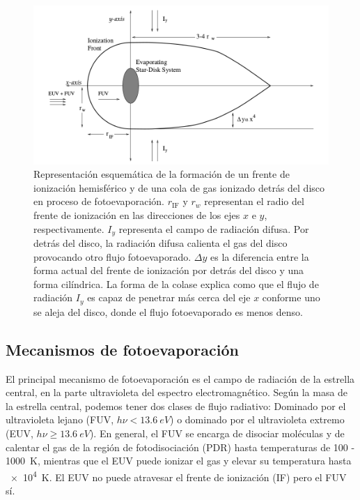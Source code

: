 \begin{figure}
  \centering
  \includegraphics[width=0.8\linewidth]{./Figures/Johnstone-shape}
  \caption{Representación esquemática de la formación de un frente de ionización hemisférico y de una cola de gas ionizado detrás del disco en proceso de fotoevaporación. $r_{\mathrm{IF}}$ y $r_w$ representan el radio del frente de ionización en las direcciones de los ejes $x$ e $y$, respectivamente. $I_y$ representa el campo de radiación difusa. Por detrás del disco, la radiación difusa calienta el gas del disco provocando otro flujo fotoevaporado. $\Delta y$ es la diferencia entre la forma actual del frente de ionización por detrás del disco y una forma cilíndrica. La forma de la colase explica como que el flujo de radiación $I_y$ es capaz de penetrar más cerca del eje $x$ conforme uno se aleja del disco, donde el flujo fotoevaporado es menos denso.}
    \label{fig:prop-shape}
\end{figure}


\subsection{Mecanismos de fotoevaporación \citep{Johnstone:1998}}
\label{sec:photoevaporation}

El principal mecanismo de fotoevaporación es el campo de radiación de la estrella central, en la parte ultravioleta del espectro electromagnético. Según la masa de la estrella central, podemos tener dos clases de flujo radiativo: Dominado por el ultravioleta lejano (FUV, $h\nu < \SI{13.6}{eV}$) o dominado por el ultravioleta extremo (EUV, $h\nu \geq \SI{13.6}{eV}$). En general, el FUV se encarga de disociar moléculas y de calentar el gas de la región de fotodisociación (PDR) hasta temperaturas de \SI{100}{} - \SI{1000}{K}, mientras que el EUV puede ionizar el gas y elevar su temperatura hasta \SI{e4}{K}. El EUV no puede atravesar el frente de ionización (IF) pero el FUV sí.

